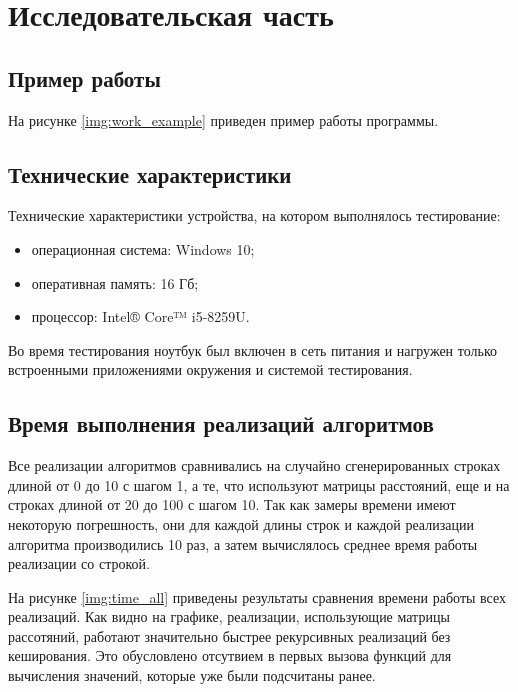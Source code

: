 \chapter{Исследовательская часть}

\section{Пример работы}

На рисунке \ref{img:work_example} приведен пример работы программы.


\section{Технические характеристики}

Технические характеристики устройства, на котором выполнялось тестирование:

\begin{itemize}
	\item операционная система: Windows 10;
	\item оперативная память: 16 Гб;
	\item процессор: Intel® Core™ i5-8259U.
\end{itemize}

Во время тестирования ноутбук был включен в сеть питания и нагружен только встроенными приложениями окружения и системой тестирования.

\section{Время выполнения реализаций алгоритмов}

 Все реализации алгоритмов сравнивались на случайно сгенерированных строках длиной от 0 до 10 с шагом 1, а те, что используют матрицы расстояний, еще и на строках длиной от 20 до 100 с шагом 10. Так как замеры времени имеют некоторую погрешность, они для каждой длины строк и каждой реализации алгоритма производились 10 раз, а затем вычислялось среднее время работы реализации со строкой.
 
На рисунке \ref{img:time_all} приведены результаты сравнения времени работы всех реализаций. Как видно на графике, реализации, использующие матрицы рассотяний, работают значительно быстрее рекурсивных реализаций без кеширования. Это обусловлено отсутвием в первых вызова функций для вычисления значений, которые уже были подсчитаны ранее.

